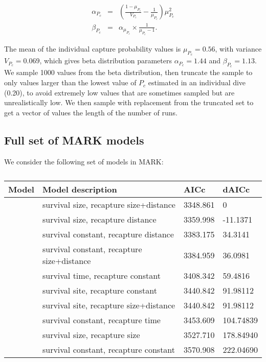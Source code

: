 \documentclass[12pt, oneside]{article}   	%
\begin{document}
\begin{eqnarray}
\alpha_{P_c} &=& (\frac{1-\mu_{P_c}}{V_{P_c}} - \frac{1}{\mu_{P_c}}) \mu_{P_c}^2 \\
\beta_{P_c} &=& \alpha_{\mu_{P_c}} \times \frac{1}{\mu_{P_c} - 1}. \label{APP_EQN_ProbCapBetaDistParams}  %
\end{eqnarray}


The mean of the individual capture probability values is $\mu_{P_c} = 0.56$, with variance $V_{P_c} = 0.069$, which gives beta distribution parameters $\alpha_{P_c} = 1.44$ and $\beta_{P_c} = 1.13$. We sample 1000 values from the beta distribution, then truncate the sample to only values larger than the lowest value of $P_c$ estimated in an individual dive (0.20), to avoid extremely low values that are sometimes sampled but are unrealistically low. We then sample with replacement from the truncated set to get a vector of values the length of the number of runs.

\newpage{}

\subsection*{Full set of MARK models} \label{APP_MARKModels}
We consider the following set of models in MARK:
\begin{table}
\begin{centering}
\begin{tabular}{|p{2in}|p{2.5in}|p{0.75in}|p{0.75in}|}
\hline 
\textbf{Model} & \textbf{Model description} & \textbf{AICc} & \textbf{dAICc} \\ \hline
& survival size, recapture size+distance & 3348.861 & 0 \\ \hline
& survival size, recapture distance & 3359.998 & -11.1371 \\ \hline
& survival constant, recapture distance & 3383.175 & 34.3141 \\ \hline
& survival constant, recapture size+distance & 3384.959 & 36.0981 \\ \hline
& survival time, recapture constant & 3408.342 & 59.4816 \\ \hline
& survival site, recapture constant & 3440.842 & 91.98112 \\ \hline
& survival site, recapture size+distance & 3440.842 & 91.98112 \\ \hline
& survival constant, recapture time & 3453.609 & 104.74839 \\ \hline
& survival size, recapture size & 3527.710 & 178.84940 \\ \hline
& survival constant, recapture constant & 3570.908 & 222.04690 \\ \hline
\end{tabular}
\end{centering}
\caption{}\label{APP_TAB_MARKmodels}
\end{table}
\end{document}
